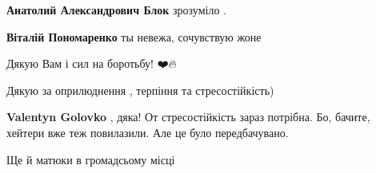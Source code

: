 \begin{itemize}
\begin{itemize}
\textbf{Анатолий Александрович Блок} зрозуміло .

 
\textbf{Віталій Пономаренко} ты невежа, сочувствую жоне

\end{itemize}

 
Дякую Вам і сил на боротьбу! ❤️🔥

 
Дякую за оприлюднення , терпіння та стресостійкість)

\begin{itemize}
 
\textbf{Valentyn Golovko} , дяка! От стресостійкість зараз потрібна. Бо, бачите, хейтери вже теж повилазили. Але це було передбачувано.
\end{itemize}

 
Ще й матюки в громадсьому місці

 

\end{itemize}
